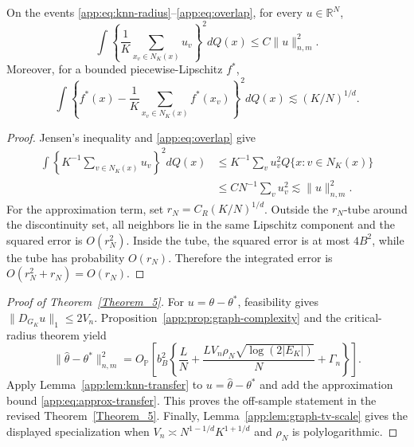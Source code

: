 \documentclass[twoside,11pt]{article}
\newenvironment{revision}{\color{revisionred}}{}
\begin{document}
\begin{revision}
\begin{lemma}
\label{app:lem:knn-transfer}
On the events \eqref{app:eq:knn-radius}--\eqref{app:eq:overlap}, for every
$u\in\mathbb R^N$,
\begin{equation}
 \int\left\{\frac1K\sum_{x_v\in N_K(x)}u_v\right\}^2dQ(x)
 \le C\|u\|_{n,m}^2.                                          \label{app:eq:estimation-transfer}
\end{equation}
Moreover, for a bounded piecewise-Lipschitz $f^*$,
\begin{equation}
 \int\left\{f^*(x)-\frac1K\sum_{x_v\in N_K(x)}f^*(x_v)\right\}^2dQ(x)
 \lesssim (K/N)^{1/d}.                                        \label{app:eq:approx-transfer}
\end{equation}
\end{lemma}

\begin{proof}
Jensen's inequality and \eqref{app:eq:overlap} give
\begin{align*}
 \int\left\{K^{-1}\sum_{v\in N_K(x)}u_v\right\}^2dQ(x)
 &\le K^{-1}\sum_vu_v^2Q\{x:v\in N_K(x)\}\\
 &\le C N^{-1}\sum_vu_v^2\lesssim\|u\|_{n,m}^2.
\end{align*}
For the approximation term, set $r_N=C_R(K/N)^{1/d}$.  Outside the
$r_N$-tube around the discontinuity set, all neighbors lie in the same
Lipschitz component and the squared error is $O(r_N^2)$.  Inside the tube, the
squared error is at most $4B^2$, while the tube has probability $O(r_N)$.
Therefore the integrated error is $O(r_N^2+r_N)=O(r_N)$.
\end{proof}

\begin{proof}[Proof of Theorem~\ref{Theorem_5}]
For $u=\theta-\theta^*$, feasibility gives
$\|D_{G_K}u\|_1\le2V_n$.  Proposition~\ref{app:prop:graph-complexity} and the
critical-radius theorem yield
\begin{equation}
 \|\widehat\theta-\theta^*\|_{n,m}^2
 =O_{\mathbb P}\left[b_B^2\left\{
 \frac{L}{N}+\frac{LV_n\rho_N\sqrt{\log(2|E_K|)}}{N}
 +\Gamma_n\right\}\right].                                   \label{app:eq:knn-insample-final}
\end{equation}
Apply Lemma~\ref{app:lem:knn-transfer} to
$u=\widehat\theta-\theta^*$ and add the approximation bound
\eqref{app:eq:approx-transfer}.  This proves the off-sample statement in the
revised Theorem~\ref{Theorem_5}.  Finally,
Lemma~\ref{app:lem:graph-tv-scale} gives the displayed specialization when
$V_n\asymp N^{1-1/d}K^{1+1/d}$ and $\rho_N$ is polylogarithmic.
\end{proof}



\end{revision}
\end{document}
